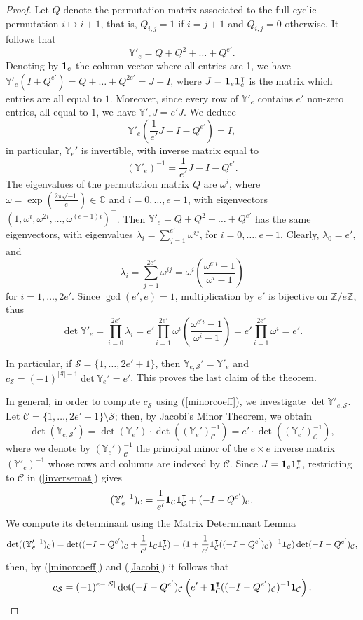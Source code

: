 \documentclass[11pt,twoside]{amsart}
\newcommand{\Z}{\mathbb Z}
\newcommand{\YY}{\mathbb Y}
\newcommand{\cS}{\mathcal{S}}
\newcommand{\cC}{\mathcal{C}}
\theoremstyle{definition}
\numberwithin{equation}{section}
\begin{document}
\begin{proof}
Let $Q$ denote the permutation matrix associated to the full cyclic permutation $i\mapsto i+1$, that is, $Q_{i,j}=1$ if $i=j+1$ and $Q_{i,j}=0$ otherwise. 
It follows that  $$\YY'_e = Q + Q^2 + \ldots + Q^{e'}.$$ 
Denoting by ${\bf 1}_e$ the column vector where all entries are 1,
we have $\YY'_e(I+Q^{e'})=Q+\ldots+Q^{2e'} = J-I$, where $J={\bf 1}_e {\bf 1}_e^\intercal$ is the matrix which entries are all equal to $1$. 
Moreover, since every row of $\YY'_e$ 
contains $e'$ non-zero entries, all equal to $1$, we have $\YY'_eJ=e'J$. 
We deduce $$\YY'_e \left(\frac{1}{e'}J-I-Q^{e'} \right)=I,$$
in particular,  $\YY_e'$ is invertible, with inverse matrix  equal to
\begin{equation}\label{inversemat}
(\YY'_e)^{-1}=\frac{1}{e'}J - I - Q^{e'}.
\end{equation}
The eigenvalues of the permutation matrix $Q$ are $\omega^i$, where $\omega=\exp(\frac{2\pi\sqrt{-1}}{e}) \in \mathbb{C}$ and $i=0,\ldots,e-1$, with eigenvectors $(1,\omega^i,\omega^{2i},\ldots,\omega^{(e-1)i})^\intercal$. 
Then  $\YY'_e=Q+Q^2+\ldots+Q^{e'}$ has the same eigenvectors, with eigenvalues $\lambda_i = \sum_{j=1}^{e'} \omega^{ij}$, for $i=0,\ldots,e-1$. 
Clearly, $\lambda_0=e'$, and $$\lambda_i = \sum_{j=1}^{2e'} \omega^{ij} = \omega^i \left(\frac{\omega^{e'i}-1}{\omega^{i}-1}\right)$$ for  $i=1,\ldots,2e'$.
Since $\gcd(e',e)=1$, multiplication by $e'$ is bijective on $\Z/e\Z$, thus
$$\det \YY'_e = \prod_{i=0}^{2e'} \lambda_i = e' \prod_{i=1}^{2e'} \omega^i  \left(\frac{\omega^{e'i}-1}{\omega^{i}-1}\right)= e' \prod_{i=1}^{2e'} \omega^i  = e'.$$

In particular, if $\cS=\{1,\ldots,2e'+1\}$, then $\YY_{e,\cS}'=\YY'_e$ and $c_\cS=(-1)^{|\cS|-1} \det \YY_e' =  e'$.
This proves the last claim of the theorem.

In general, in order to compute $c_\cS$ using (\ref{minorcoeff}), we investigate $\det \YY'_{e,\cS}$. 
Let $\cC=\{1,\ldots,2e'+1\} \setminus \cS$; 
then, by Jacobi's Minor Theorem, we obtain
\begin{equation}\label{Jacobi}
\det(\YY_{e,\cS}')= \det(\YY_e') \cdot \det( (\YY_e')^{-1}_\cC)=e' \cdot \det( (\YY_e')^{-1}_\cC),
\end{equation}
where we denote by $(\YY_e')^{-1}_\cC$ the principal minor of the $e \times e$ inverse matrix $(\YY'_e)^{-1}$ whose rows and columns are indexed by $\cC$. 
Since $J={\bf 1}_e {\bf 1}_e^\intercal$, restricting to $\cC$ in (\ref{inversemat}) gives $$(\YY'^{-1}_e)_\cC= \frac{1}{e'}{\bf 1}_\cC {\bf 1}_\cC^\intercal + (-I-Q^{e'})_\cC.$$
We compute its determinant using the Matrix Determinant Lemma
$$\det((\YY'^{-1}_e)_\cC)=\det((-I-Q^{e'})_\cC + \frac{1}{e'}{\bf 1}_\cC {\bf 1}_\cC^\intercal)=(1+\frac{1}{e'}{\bf 1}_\cC^\intercal ((-I-Q^{e'})_\cC)^{-1}{\bf 1}_\cC )\det(-I-Q^{e'})_\cC,$$
 then, by (\ref{minorcoeff}) and (\ref{Jacobi}) it follows that
\begin{equation}\label{coeffinv1}
c_\cS = (-1)^{e-|\cS|} \det(-I-Q^{e'})_\cC \left( e'+ {\bf 1}_\cC^\intercal ((-I-Q^{e'})_\cC)^{-1}{\bf 1}_\cC  \right).
\end{equation}


\end{proof}
\end{document}
